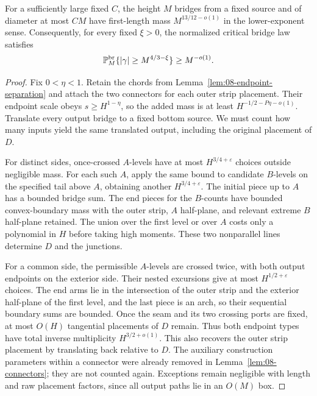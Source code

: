 \begin{proposition}
\label{prop:08-localized-length}
For a sufficiently large fixed \(C\), the height \(M\) bridges from a
fixed source and of diameter at most \(CM\) have first-length mass
\(M^{13/12-o(1)}\) in the lower-exponent sense. Consequently, for every
fixed \(\xi>0\), the normalized critical bridge law satisfies
\begin{equation}
 \mathbb P_M^{\mathrm{br}}\{|\gamma|\ge M^{4/3-\xi}\}\ge M^{-o(1)}.
 \label{eq:R-32d}
\end{equation}
\end{proposition}
\begin{proof}
Fix $0<\eta<1$. Retain the chords from
Lemma~\ref{lem:08-endpoint-separation} and attach the two connectors for
each outer strip placement. Their endpoint scale
obeys \(s\ge H^{1-\eta}\), so the added mass is at least
\(H^{-1/2-P\eta-o(1)}\). Translate every output bridge to a fixed
bottom source. We must count how many inputs yield the same translated
output, including the original placement of \(D\).

For distinct sides, once-crossed \(A\)-levels have at most
\(H^{3/4+\varepsilon}\) choices outside negligible mass. For each such
\(A\), apply the same bound to candidate \(B\)-levels on the specified
tail above \(A\), obtaining another \(H^{3/4+\varepsilon}\). The
initial piece up to \(A\) has a bounded bridge sum. The end pieces for
the \(B\)-counts have bounded convex-boundary mass with the outer strip,
\(A\) half-plane, and relevant extreme \(B\) half-plane retained.
The union over the first level or over \(A\) costs only a polynomial in
\(H\) before taking high moments. These two nonparallel lines determine
\(D\) and the junctions.

For a common side, the permissible \(A\)-levels are crossed twice, with
both output endpoints on the exterior side. Their nested excursions give
at most \(H^{1/2+\varepsilon}\) choices. The end arms lie in the
intersection of the outer strip and the exterior half-plane of the first
level, and the last piece is an arch, so their sequential boundary sums
are bounded. Once the seam and its two crossing ports are fixed, at most
\(O(H)\) tangential placements of \(D\) remain. Thus both endpoint
types have total inverse multiplicity \(H^{3/2+o(1)}\). This also
recovers the outer strip placement by translating back relative to \(D\).
The auxiliary construction parameters within a connector were already
removed in Lemma~\ref{lem:08-connectors}; they are not counted again.
Exceptions remain negligible with length and raw placement factors, since
all output paths lie in an \(O(M)\) box.


\end{proof}
